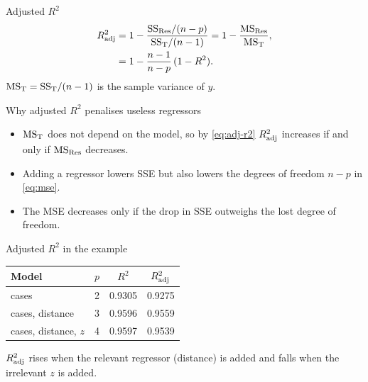 \begin{frame}{Adjusted $R^2$}
    \begin{align}
        R^2_{\mathrm{adj}} &= 1 - \frac{\mathrm{SS}_{\mathrm{Res}}/(n-p)}{\mathrm{SS}_{\mathrm{T}}/(n-1)} = 1 - \frac{\mathrm{MS}_{\mathrm{Res}}}{\mathrm{MS}_{\mathrm{T}}}, \label{eq:adj-r2}\\
        &= 1 - \frac{n-1}{n-p}\,(1-R^2). \label{eq:adj-r2-alt}
    \end{align}
    $\mathrm{MS}_{\mathrm{T}}=\mathrm{SS}_{\mathrm{T}}/(n-1)$ is the sample variance of $y$.
\end{frame}


\begin{frame}{Why adjusted $R^2$ penalises useless regressors}
    \begin{itemize}
        \item $\mathrm{MS}_{\mathrm{T}}$ does not depend on the model, so by \eqref{eq:adj-r2} $R^2_{\mathrm{adj}}$ increases if and only if $\mathrm{MS}_{\mathrm{Res}}$ decreases.
        \item Adding a regressor lowers SSE but also lowers the degrees of freedom $n-p$ in \eqref{eq:mse}.
        \item The MSE decreases only if the drop in SSE outweighs the lost degree of freedom.
    \end{itemize}
\end{frame}


\begin{frame}{Adjusted $R^2$ in the example}
    \begin{center}
        \begin{tabular}{lccc}
            \toprule
            Model & $p$ & $R^2$ & $R^2_{\mathrm{adj}}$ \\
            \midrule
            cases                       & 2 & 0.9305  & 0.9275 \\
            cases, distance             & 3 & 0.9596  & 0.9559 \\
            cases, distance, $z$        & 4 & 0.9597  & 0.9539 \\
            \bottomrule
        \end{tabular}
    \end{center}
    $R^2_{\mathrm{adj}}$ rises when the relevant regressor (distance) is added and falls when the irrelevant $z$ is added.
\end{frame}


